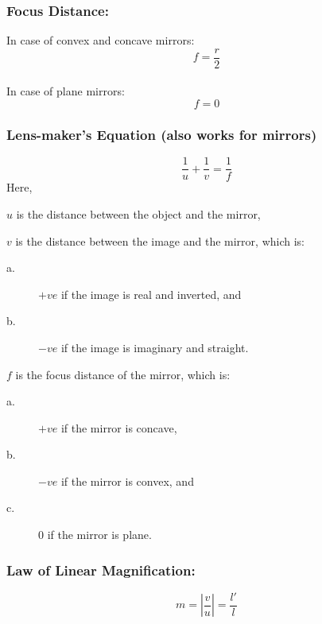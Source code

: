 \documentclass[a4paper]{report}
\begin{document}
        \subsubsection{Focus Distance: }
            In case of convex and concave mirrors:
            \begin{equation}
                f = \frac{r}{2}
            \end{equation}
            \\
            In case of plane mirrors:
            \begin{equation}
                f = 0
            \end{equation}
        \subsubsection{Lens-maker's Equation (also works for mirrors)}
            \begin{equation}
                \frac{1}{u} + \frac{1}{v} = \frac{1}{f}
            \end{equation}
            Here,
            \begin{description}
                \item $u$ is the distance between the object and the mirror,
                \item $v$ is the distance between the image and the mirror, which is:
                    \begin{description}
                        \item[a.] $+ve$ if the image is real and inverted, and
                        \item[b.] $-ve$ if the image is imaginary and straight. 
                    \end{description}
                \item $f$ is the focus distance of the mirror, which is:
                    \begin{description}
                        \item[a.] $+ve$ if the mirror is concave,
                        \item[b.] $-ve$ if the mirror is convex, and
                        \item[c.] $0$ if the mirror is plane.
                    \end{description}
            \end{description}
        \subsubsection{Law of Linear Magnification: }
            \begin{equation}
                m = |\frac{v}{u}| = \frac{l'}{l}
            \end{equation}
\end{document}
